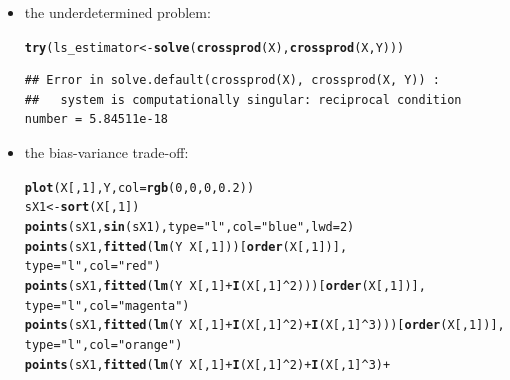 \documentclass[a4paper]{article}
\makeatletter
\newcommand{\hlnum}[1]{\textcolor[rgb]{0.686,0.059,0.569}{#1}}%
\newcommand{\hlstr}[1]{\textcolor[rgb]{0.192,0.494,0.8}{#1}}%
\newcommand{\hlopt}[1]{\textcolor[rgb]{0,0,0}{#1}}%
\newcommand{\hlstd}[1]{\textcolor[rgb]{0.345,0.345,0.345}{#1}}%
\newcommand{\hlkwb}[1]{\textcolor[rgb]{0.69,0.353,0.396}{#1}}%
\newcommand{\hlkwc}[1]{\textcolor[rgb]{0.333,0.667,0.333}{#1}}%
\newcommand{\hlkwd}[1]{\textcolor[rgb]{0.737,0.353,0.396}{\textbf{#1}}}%
\newenvironment{kframe}{%
 \def\at@end@of@kframe{}%
 \ifinner\ifhmode%
  \def\at@end@of@kframe{\end{minipage}}%
  \begin{minipage}{\columnwidth}%
 \fi\fi%
 \def\FrameCommand##1{\hskip\@totalleftmargin \hskip-\fboxsep
 \colorbox{shadecolor}{##1}\hskip-\fboxsep
     \hskip-\linewidth \hskip-\@totalleftmargin \hskip\columnwidth}%
 \MakeFramed {\advance\hsize-\width
   \@totalleftmargin\z@ \linewidth\hsize
   \@setminipage}}%
 {\par\unskip\endMakeFramed%
 \at@end@of@kframe}
\newenvironment{knitrout}{}{} %
\makeatother
\begin{document}
{\begin{enumerate}
\begin{itemize}
\item the underdetermined problem:
\begin{knitrout}
\color{fgcolor}\begin{kframe}
\begin{alltt}
\hlkwd{try}\hlstd{(ls_estimator} \hlkwb{<-} \hlkwd{solve}\hlstd{(}\hlkwd{crossprod}\hlstd{(X),} \hlkwd{crossprod}\hlstd{(X,Y)))}
\end{alltt}
\begin{verbatim}
## Error in solve.default(crossprod(X), crossprod(X, Y)) : 
##   system is computationally singular: reciprocal condition number = 5.84511e-18
\end{verbatim}
\end{kframe}
\end{knitrout}
\item the bias-variance trade-off:
\begin{knitrout}
\color{fgcolor}\begin{kframe}
\begin{alltt}
\hlkwd{plot}\hlstd{(X[,}\hlnum{1}\hlstd{], Y,} \hlkwc{col}\hlstd{=}\hlkwd{rgb}\hlstd{(}\hlnum{0}\hlstd{,}\hlnum{0}\hlstd{,}\hlnum{0}\hlstd{,}\hlnum{0.2}\hlstd{))}
\hlstd{sX1} \hlkwb{<-} \hlkwd{sort}\hlstd{(X[,}\hlnum{1}\hlstd{])}
\hlkwd{points}\hlstd{(sX1,} \hlkwd{sin}\hlstd{(sX1),} \hlkwc{type}\hlstd{=}\hlstr{"l"}\hlstd{,} \hlkwc{col}\hlstd{=}\hlstr{"blue"}\hlstd{,} \hlkwc{lwd}\hlstd{=}\hlnum{2}\hlstd{)}
\hlkwd{points}\hlstd{(sX1,} \hlkwd{fitted}\hlstd{(}\hlkwd{lm}\hlstd{(Y} \hlopt{~} \hlstd{X[,}\hlnum{1}\hlstd{]))[}\hlkwd{order}\hlstd{(X[,}\hlnum{1}\hlstd{])],}
       \hlkwc{type}\hlstd{=}\hlstr{"l"}\hlstd{,} \hlkwc{col}\hlstd{=}\hlstr{"red"}\hlstd{)}
\hlkwd{points}\hlstd{(sX1,} \hlkwd{fitted}\hlstd{(}\hlkwd{lm}\hlstd{(Y} \hlopt{~} \hlstd{X[,}\hlnum{1}\hlstd{]} \hlopt{+} \hlkwd{I}\hlstd{(X[,}\hlnum{1}\hlstd{]}\hlopt{^}\hlnum{2}\hlstd{)))[}\hlkwd{order}\hlstd{(X[,}\hlnum{1}\hlstd{])],}
       \hlkwc{type}\hlstd{=}\hlstr{"l"}\hlstd{,} \hlkwc{col}\hlstd{=}\hlstr{"magenta"}\hlstd{)}
\hlkwd{points}\hlstd{(sX1,} \hlkwd{fitted}\hlstd{(}\hlkwd{lm}\hlstd{(Y} \hlopt{~} \hlstd{X[,}\hlnum{1}\hlstd{]} \hlopt{+} \hlkwd{I}\hlstd{(X[,}\hlnum{1}\hlstd{]}\hlopt{^}\hlnum{2}\hlstd{)} \hlopt{+} \hlkwd{I}\hlstd{(X[,}\hlnum{1}\hlstd{]}\hlopt{^}\hlnum{3}\hlstd{)))[}\hlkwd{order}\hlstd{(X[,}\hlnum{1}\hlstd{])],}
       \hlkwc{type}\hlstd{=}\hlstr{"l"}\hlstd{,} \hlkwc{col}\hlstd{=}\hlstr{"orange"}\hlstd{)}
\hlkwd{points}\hlstd{(sX1,} \hlkwd{fitted}\hlstd{(}\hlkwd{lm}\hlstd{(Y} \hlopt{~} \hlstd{X[,}\hlnum{1}\hlstd{]} \hlopt{+} \hlkwd{I}\hlstd{(X[,}\hlnum{1}\hlstd{]}\hlopt{^}\hlnum{2}\hlstd{)} \hlopt{+} \hlkwd{I}\hlstd{(X[,}\hlnum{1}\hlstd{]}\hlopt{^}\hlnum{3}\hlstd{)} \hlopt{+}

\end{alltt}
\end{kframe}
\end{knitrout}
\end{itemize}
\end{enumerate}}
\end{document}
